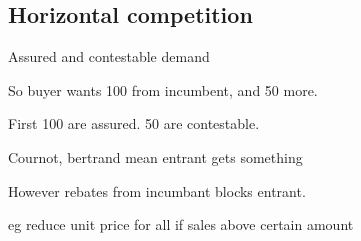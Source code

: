 
\subsection{Horizontal competition}

Assured and contestable demand

So buyer wants 100 from incumbent, and 50 more. 

First 100 are assured. 50 are  contestable.

Cournot, bertrand mean entrant gets something

However rebates from incumbant blocks entrant.

eg reduce unit price for all if sales above certain amount

